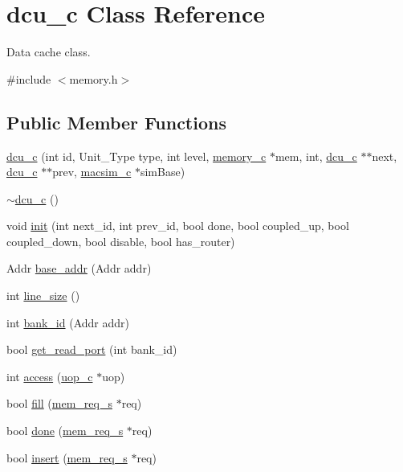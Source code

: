 \hypertarget{classdcu__c}{
\section{dcu\_\-c Class Reference}
\label{classdcu__c}
}


Data cache class.  




{\ttfamily \#include $<$memory.h$>$}

\subsection*{Public Member Functions}
\begin{DoxyCompactItemize}
\item 
\hyperlink{classdcu__c_a84d2ec5db30f22a7aa008351840c2a06}{dcu\_\-c} (int id, Unit\_\-Type type, int level, \hyperlink{classmemory__c}{memory\_\-c} $\ast$mem, int, \hyperlink{classdcu__c}{dcu\_\-c} $\ast$$\ast$next, \hyperlink{classdcu__c}{dcu\_\-c} $\ast$$\ast$prev, \hyperlink{classmacsim__c}{macsim\_\-c} $\ast$simBase)
\item 
\hyperlink{classdcu__c_abea9e7fc68c881ce476cfac7ea891b38}{$\sim$dcu\_\-c} ()
\item 
void \hyperlink{classdcu__c_ae9bcbaf9b038e512463c0879b9e42908}{init} (int next\_\-id, int prev\_\-id, bool done, bool coupled\_\-up, bool coupled\_\-down, bool disable, bool has\_\-router)
\item 
Addr \hyperlink{classdcu__c_a72fb58ab8c0ec711dd31e092e51868a1}{base\_\-addr} (Addr addr)
\item 
int \hyperlink{classdcu__c_a71826360b5e10085fdc427c1f3343b2b}{line\_\-size} ()
\item 
int \hyperlink{classdcu__c_a1fbf4dc5547edff38eb6806294563d91}{bank\_\-id} (Addr addr)
\item 
bool \hyperlink{classdcu__c_a4f712cf333d79a702e40d83935151e29}{get\_\-read\_\-port} (int bank\_\-id)
\item 
int \hyperlink{classdcu__c_a1bfcfc18396925fd9665f6946e73a065}{access} (\hyperlink{classuop__c}{uop\_\-c} $\ast$uop)
\item 
bool \hyperlink{classdcu__c_ad0550e80ffac6ce3078502864f740d5b}{fill} (\hyperlink{structmem__req__s}{mem\_\-req\_\-s} $\ast$req)
\item 
bool \hyperlink{classdcu__c_a5f10df3e409da7fe249aa8c6d87ac6cf}{done} (\hyperlink{structmem__req__s}{mem\_\-req\_\-s} $\ast$req)
\item 
bool \hyperlink{classdcu__c_a215d1e1c6099c6dda22c0cf12b6bd7a4}{insert} (\hyperlink{structmem__req__s}{mem\_\-req\_\-s} $\ast$req)

\end{DoxyCompactItemize}
